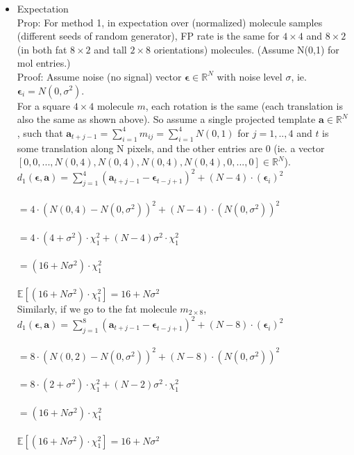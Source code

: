 \documentclass[11pt]{article}
\newcommand{\ba}{\boldsymbol{a}}
\newcommand{\R}{\mathbb{R}}
\begin{document}
    
    \begin{itemize}
        \item Expectation\\
        Prop: For method 1, in expectation over (normalized) molecule samples (different seeds of random generator), FP rate is the same for $4\times 4$ and $8\times 2$ (in both fat $8\times 2$ and tall $2\times 8$ orientations) molecules. (Assume N(0,1) for mol entries.)\\
        
        Proof:
        Assume noise (no signal) vector $\mathbf{\epsilon} \in \R^N$ with noise level $\sigma$, ie. $\mathbf{\epsilon}_i = N(0,\sigma^2)$.\\
        For a square $4\times 4$ molecule $m$, each rotation is the same (each translation is also the same as shown above). So assume a single projected template $\ba \in \R^N$, such that $\ba_{t+j-1} = \sum_{i=1}^4 m_{ij} = \sum_{i=1}^4 N(0,1)$ for $j = 1,..,4$ and $t$ is some translation along N pixels, and the other entries are 0 (ie. a vector $[0,0,...,N(0,4), N(0,4), N(0,4), N(0,4),0,...,0] \in \R^N$). \\
        
        $d_{1}(\mathbf{\epsilon}, \ba) = \sum_{j=1}^4 {(\ba_{t+j-1} - \mathbf{\epsilon}_{t-j+1})}^2 + (N-4)\cdot {(\mathbf{\epsilon}_i)}^2$ \\\\
        $= 4 \cdot {(N(0,4)-N(0,\sigma^2))}^2 + (N-4) \cdot {(N(0,\sigma^2))}^2$\\\\
        $= 4 \cdot (4+\sigma^2)\cdot \chi_1^2 + (N-4)\sigma^2 \cdot \chi_1^2$\\\\
        $= (16 + N\sigma^2) \cdot \chi_1^2$\\\\
        $\mathbb{E} [(16 + N\sigma^2) \cdot \chi_1^2] = 16 + N\sigma^2$\\
        
        Similarly, if we go to the fat molecule $m_{2 \times 8}$,\\
        $d_{1}(\mathbf{\epsilon}, \ba) = \sum_{j=1}^8 {(\ba_{t+j-1} - \mathbf{\epsilon}_{t-j+1})}^2 + (N-8)\cdot {(\mathbf{\epsilon}_i)}^2$ \\\\
        $= 8 \cdot {(N(0,2)-N(0,\sigma^2))}^2 + (N-8) \cdot {(N(0,\sigma^2))}^2$\\\\
        $= 8 \cdot (2+\sigma^2)\cdot \chi_1^2 + (N-2)\sigma^2 \cdot \chi_1^2$\\\\
        $= (16 + N\sigma^2) \cdot \chi_1^2$\\\\
        $\mathbb{E} [(16 + N\sigma^2) \cdot \chi_1^2] = 16 + N\sigma^2$\\
        

\end{itemize}
\end{document}
